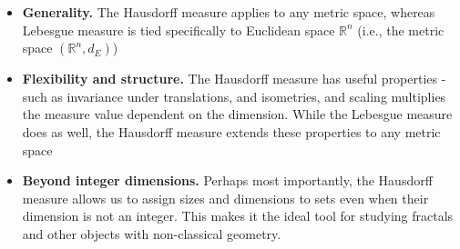 \documentclass{article}
\theoremstyle{plain}
\theoremstyle{definition}
\theoremstyle{remark}
\begin{document}
\begin{itemize}
\begin{center}


\end{center}


 Let $A$ be this curve. This curve has no area, so $\lambda_2(A)= 0$ (this curve has length so is 1-dimensional). On the other hand, $\lambda _1(A)$ is not defined. So, how can we measure this set? This is where we can use the Hausdorff measure.
    \item \textbf{Generality.} The Hausdorff measure applies to any metric space, whereas Lebesgue measure is tied specifically to Euclidean space $\mathbb{R}^n$ (i.e., the metric space $(\mathbb{R}^n, d_E)$)

    \item \textbf{Flexibility and structure.} The Hausdorff measure has useful properties - such as invariance under translations, and isometries, and scaling multiplies the measure value dependent on the dimension. While the Lebesgue measure does as well, the Hausdorff measure extends these properties to any metric space
    \item \textbf{Beyond integer dimensions.} Perhaps most importantly, the Hausdorff measure allows us to assign sizes and dimensions to sets even when their dimension is not an integer. This makes it the ideal tool for studying fractals and other objects with non-classical geometry.

    \end{itemize}

\newpage
\end{document}
